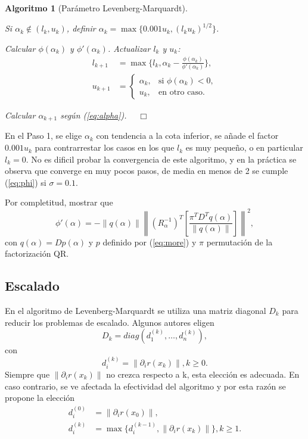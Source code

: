 \documentclass[11pt,a4paper]{book}
\newtheorem{algorithm}[theorem]{Algoritmo}
\theoremstyle{definition}
\theoremstyle{remark}
\newcommand{\norm}[1]{\left\lVert#1\right\rVert}
\begin{document}
\begin{algorithm}[Parámetro Levenberg-Marquardt]\leavevmode
	\begin{steps}
		\item Si $\alpha_k \notin (l_k, u_k)$, definir $\alpha_k = \max \{0.001u_k, (l_ku_k)^{1/2}\}$.	
		\item Calcular $\phi(\alpha_k)$ y $\phi'(\alpha_k)$. Actualizar $l_k$ y $u_k$:
			\begin{align*}
				l_{k+1} &= \max \{l_k, \alpha_k-\frac{\phi(\alpha_k)}{\phi'(\alpha_k)}\}, \\
				u_{k+1} &= \begin{cases}
					\alpha_k, & \text{si } \phi(\alpha_k) < 0, \\
					u_k, & \text{en otro caso}.
				\end{cases}
			\end{align*}
		\item Calcular $\alpha_{k+1}$ según (\ref{eq:alpha}). $\quad \Box$
	\end{steps}
\end{algorithm}
En el Paso 1, se elige $\alpha_k$ con tendencia a la cota inferior, se añade el factor $0.001u_k$ para
contrarrestar los casos en los que $l_k$ es muy pequeño, o en particular $l_k=0$. No es dificil probar
la convergencia de este algoritmo, y en la práctica se observa que converge en muy pocos pasos,
de media en menos de 2 se cumple (\ref{eq:phi}) si $\sigma=0.1$.

Por completitud, mostrar que
\begin{equation}
	\phi'(\alpha)=-\norm{q(\alpha)} \norm{(R_{\alpha}^{-1})^T\left[
		\frac{\pi^TD^Tq(\alpha)}{\norm{q(\alpha)}}
	 \right] }^2,
\end{equation}
con $q(\alpha)=Dp(\alpha)$ y $p$ definido por (\ref{eq:more}) y $\pi$ permutación de la
factorización QR.

\subsection{Escalado}
En el algoritmo de Levenberg-Marquardt se utiliza una matriz diagonal $D_k$ para
reducir los problemas de escalado.
Algunos autores eligen
\begin{equation}\label{eq:diag}
	D_k = diag(d_1^{(k)}, \ldots, d_n^{(k)}),
\end{equation}
con
\begin{equation}
	d_i^{(k)}=\norm{\partial_ir(x_k)}, k\geq 0.
\end{equation}
Siempre que $\norm{\partial_ir(x_k)}$ no crezca respecto a k, esta elección es adecuada. En caso contrario,
se ve afectada la efectividad del algoritmo y por esta razón se propone la elección
\begin{equation} \label{eq:di}
	\begin{split}
	d_i^{(0)} &= \norm{\partial_ir(x_0)}, \\
	d_i^{(k)} &= \max \{d_i^{(k-1)}, \norm{\partial_ir(x_k)}\}, k\geq 1.
	\end{split}
\end{equation}
\end{document}
